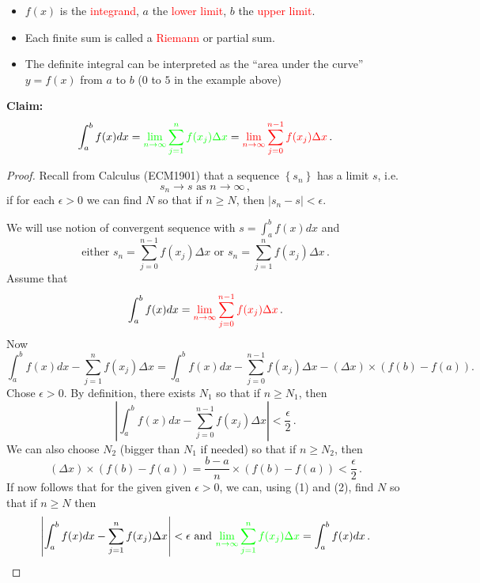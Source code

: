 \documentclass{article}
\begin{document}
\begin{itemize}
\item
$f(x)$ is the \textcolor{red}{integrand}, $a$ the \textcolor{red}{lower limit}, $b$ the \textcolor{red}{upper limit}. 
\item
Each finite sum is called a \textcolor{red}{Riemann} or partial sum.
\item
The definite integral can be interpreted as the ``area under the curve'' $y=f(x)$ from $a$ to $b$ ($0$ to $5$ in the example above)
\end{itemize}
\textbf{Claim:}
$$
\int_a^b f(x) dx=\textcolor{green}{ \lim_{n \to \infty} \sum_{j=1}^{n} f(x_j) \Delta x} =  \textcolor{red}{ \lim_{n \to \infty} \sum_{j=0}^{n-1} f(x_j) \Delta x}\,.
$$
\begin{proof}
Recall from Calculus (ECM1901) that a sequence $\left\{ s_n \right\}$ has a limit $s$, i.e.
$$
s_n \rightarrow s \mbox{ as } n \rightarrow \infty\,,
$$
if for each $\epsilon > 0$ we can find
$N$ so that if $n \geq N$, then $|s_n - s| < \epsilon$. 


We will use notion  of convergent sequence with $s = \int_a^b f(x) dx$ and 
$$
\mbox{either    } s_n = \sum_{j=0}^{n-1} f(x_j) \Delta x \mbox{    or    } s_n = \sum_{j=1}^{n} f(x_j) \Delta x\,.
$$
Assume that
$$
\int_a^b f(x) dx =  \textcolor{red}{\lim_{n \to \infty} \sum_{j=0}^{n-1} f(x_j) \Delta x}\,.
$$
Now
{\small 
$$
\int_a^b f(x) dx -  \sum_{j=1}^{n} f(x_j) \Delta x = \int_a^b f(x) dx -  \sum_{j=0}^{n-1} f(x_j) \Delta x - (\Delta x) \times \left( f(b) - f(a) \right).
$$
}
Chose $\epsilon > 0$. By definition, there exists $N_1$ so that if $n \geq N_1$, then
\begin{equation}
\left|\int_a^b f(x) dx -  \sum_{j=0}^{n-1} f(x_j) \Delta x \right| < \frac{\epsilon}{2}\,.
\end{equation}
We can also choose $N_2$ (bigger than $N_1$ if needed) so that if $n \geq N_2$, then 
\begin{equation}
(\Delta x) \times \left( f(b) - f(a) \right) = \frac{b-a}{n} \times \left( f(b) - f(a) \right) < \frac{\epsilon}{2}\,.
\end{equation}
If now follows that for the given given $\epsilon > 0$, we can, using (1) and (2), find $N$ so that if $n \geq N$ then
$$
\left|\int_a^b f(x) dx -  \sum_{j=1}^{n} f(x_j) \Delta x \right| < \epsilon \mbox{  and  } \textcolor{green}{ \lim_{n \to \infty} \sum_{j=1}^{n} f(x_j) \Delta x} = \int_a^b f(x) dx\,.
$$
\end{proof}
\hrulefill
\end{document}
